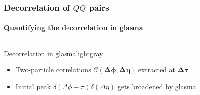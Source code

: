\documentclass[aspectratio=169,11pt,usenames,dvipsnames]{beamer}
\begin{document}
\begin{frame}
    \frametitle{Decorrelation of $Q\overline{Q}$ pairs}
    \framesubtitle{Quantifying the decorrelation in glasma}
    \vspace{-15pt}
    \begin{center}
        \begin{columns}[onlytextwidth,t]
           \begin{center}
                \begin{custombox2}{\normalsize Decorrelation in glasma}{lightgray}
                    \small
                    \begin{varwidth}{\textwidth}
                    \begin{itemize}\itemsep0em 
                        \itemsep0em
                        \footnotesize
                        \item Two-particle correlations $\boldsymbol{\mathcal{C}(\Delta\phi, \Delta\eta)}$ extracted at $\boldsymbol{\Delta\tau}$
                        \item Initial peak $\delta(\Delta\phi-\pi)\delta(\Delta\eta)$ gets broadened by glasma
                    \end{itemize}
                    \end{varwidth}
                \end{custombox2}


\end{center}
\end{columns}
\end{center}
\end{frame}
\end{document}
